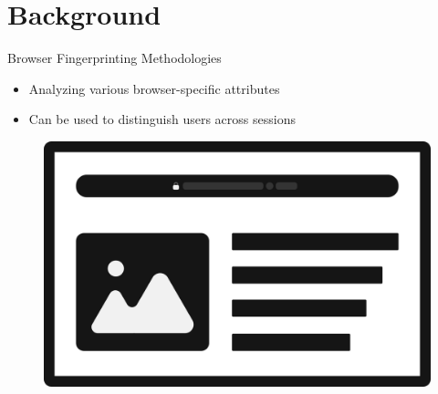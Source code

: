 \documentclass[aspectratio=169]{beamer}
[aspectratio=169] %
\begin{document}
\section{Background}

\begin{frame}{Browser Fingerprinting Methodologies}
  \begin{minipage}{0.49\textwidth} 
    \begin{itemize}
      \item Analyzing various browser-specific attributes
      \pause
      \item Can be used to distinguish users across sessions
    \end{itemize}
  \end{minipage}
  \hfill
  \begin{minipage}{0.49\textwidth} 
    \begin{figure}
      \centering
      \includegraphics[height=0.5\textheight]{figures/browser.png}
    \end{figure}
  \end{minipage}
\end{frame}
\end{document}
